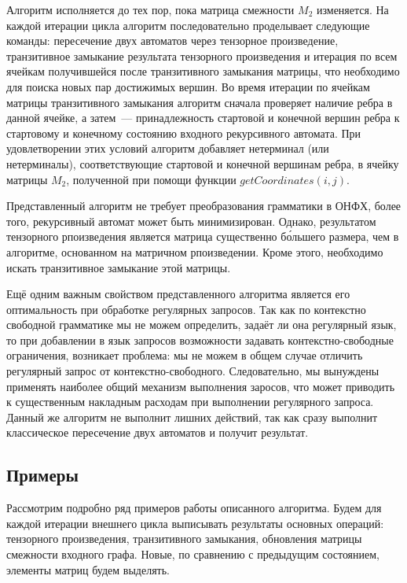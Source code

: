 Алгоритм исполняется до тех пор, пока матрица смежности $M_2$ изменяется.
На каждой итерации цикла алгоритм последовательно проделывает следующие команды: пересечение двух автоматов через тензорное произведение, транзитивное замыкание результата тензорного произведения и итерация по всем ячейкам получившейся после транзитивного замыкания матрицы, что необходимо для поиска новых пар достижимых вершин.
Во время итерации по ячейкам матрицы транзитивного замыкания алгоритм сначала проверяет наличие ребра в данной ячейке, а затем~--- принадлежность стартовой и конечной вершин ребра к стартовому и конечному состоянию входного рекурсивного автомата.
При удовлетворении этих условий алгоритм добавляет нетерминал (или нетерминалы), соответствующие стартовой и конечной вершинам ребра, в ячейку матрицы $M_2$, полученной при помощи функции $getCoordinates(i,j)$.

Представленный алгоритм не требует преобразования грамматики в ОНФХ, более того, рекурсивный автомат может быть минимизирован. Однако, результатом тензорного рпоизведения является матрица существенно б\'{о}льшего размера, чем в алгоритме, основанном на матричном рпоизведении.
Кроме этого, необходимо искать транзитивное замыкание этой матрицы.

Ещё одним важным свойством представленного алгоритма является его оптимальность при обработке регулярных запросов.
Так как по контекстно свободной грамматике мы не можем определить, задаёт ли она регулярный язык, то при добавлении в язык запросов возможности задавать контекстно-свободные ограничения, возникает проблема: мы не можем в общем случае отличить регулярный запрос от контекстно-свободного. Следовательно, мы вынуждены применять наиболее общий механизм выполнения заросов, что может приводить к существенным накладным расходам при выполнении регулярного запроса.
Данный же алгоритм не выполнит лишних действий, так как сразу выполнит классическое пересечение двух автоматов и получит результат.

\subsection{Примеры}

Рассмотрим подробно ряд примеров работы описанного алгоритма.
Будем для каждой итерации внешнего цикла выписывать результаты основных операций: тензорного произведения, транзитивного замыкания, обновления матрицы смежности входного графа.
Новые, по сравнению с предыдущим состоянием, элементы матриц будем выделять.

